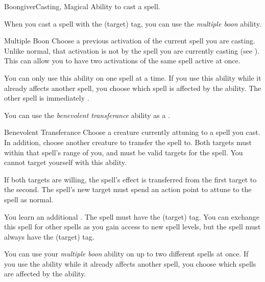     \begin{feat}{Boongiver}{Casting, Magical}
        \featpre Ability to cast a spell.

         When you cast a spell with the  (target) tag, you can use the \textit{multiple boon} ability.
        \begin{freeability}{Multiple Boon}
            Choose a previous activation of the current spell you are casting.
            Unlike normal, that activation is not  by the spell you are currently casting (see ).
            This can allow you to have two activations of the same spell active at once.

            You can only use this ability on one spell at a time.
            If you use this ability while it already affects another spell, you choose which spell is affected by the ability.
            The other spell is immediately .
        \end{freeability}

         You can use the \textit{benevolent transferance} ability as a .
        \begin{freeability}{Benevolent Transferance}
            Choose a creature currently attuning to a spell you cast.
            In addition, choose another creature to transfer the spell to.
            Both targets must within that spell's range of you, and must be valid targets for the spell.
            You cannot target yourself with this ability.

            If both targets are willing, the spell's effect is transferred from the first target to the second.
            The spell's new target must spend an action point to attune to the spell as normal.
        \end{freeability}

         You learn an additional .
        The spell must have the  (target) tag.
        You can exchange this spell for other spells as you gain access to new spell levels, but the spell must always have the  (target) tag.

         You can use your \textit{multiple boon} ability on up to two different spells at once.
        If you use the ability while it already affects another spell, you choose which spells are affected by the ability.


\end{feat}
